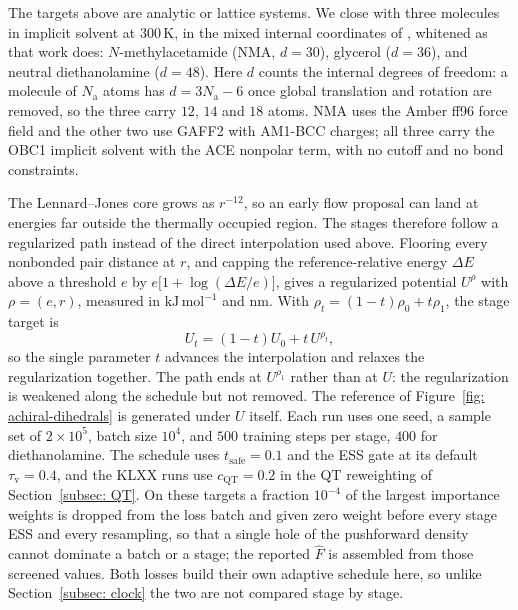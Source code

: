\documentclass{article}
\begin{document}
The targets above are analytic or lattice systems. We close with three molecules in implicit solvent at $300\,\mathrm K$, in the mixed internal coordinates of \citet{noe2019boltzmann}, whitened as that work does: $N$-methylacetamide (NMA, $d=30$), glycerol ($d=36$), and neutral diethanolamine ($d=48$). Here $d$ counts the internal degrees of freedom: a molecule of $N_{\mathrm a}$ atoms has $d=3N_{\mathrm a}-6$ once global translation and rotation are removed, so the three carry $12$, $14$ and $18$ atoms. NMA uses the Amber ff96 force field and the other two use GAFF2 with AM1-BCC charges; all three carry the OBC1 implicit solvent with the ACE nonpolar term, with no cutoff and no bond constraints.

The Lennard--Jones core grows as $r^{-12}$, so an early flow proposal can land at energies far outside the thermally occupied region. The stages therefore follow a regularized path instead of the direct interpolation used above. Flooring every nonbonded pair distance at $r$, and capping the reference-relative energy $\Delta E$ above a threshold $e$ by $e\bigl[1+\log(\Delta E/e)\bigr]$, gives a regularized potential $U^{\rho}$ with $\rho=(e,r)$, measured in $\mathrm{kJ\,mol^{-1}}$ and $\mathrm{nm}$. With $\rho_t=(1-t)\rho_0+t\rho_1$, the stage target is
\begin{equation}
	U_t=(1-t)U_0+t\,U^{\rho_t},
	\label{eq: achiral-diagonal}
\end{equation}
so the single parameter $t$ advances the interpolation and relaxes the regularization together. The path ends at $U^{\rho_1}$ rather than at $U$: the regularization is weakened along the schedule but not removed. The reference of Figure~\ref{fig: achiral-dihedrals} is generated under $U$ itself. Each run uses one seed, a sample set of $2\times10^5$, batch size $10^4$, and $500$ training steps per stage, $400$ for diethanolamine. The schedule uses $t_{\mathrm{safe}}=0.1$ and the ESS gate at its default $\tau_{\mathrm v}=0.4$, and the KLXX runs use $c_{\mathrm{QT}}=0.2$ in the QT reweighting of Section~\ref{subsec: QT}. On these targets a fraction $10^{-4}$ of the largest importance weights is dropped from the loss batch and given zero weight before every stage ESS and every resampling, so that a single hole of the pushforward density cannot dominate a batch or a stage; the reported $\hat F$ is assembled from those screened values. Both losses build their own adaptive schedule here, so unlike Section~\ref{subsec: clock} the two are not compared stage by stage.
\end{document}
